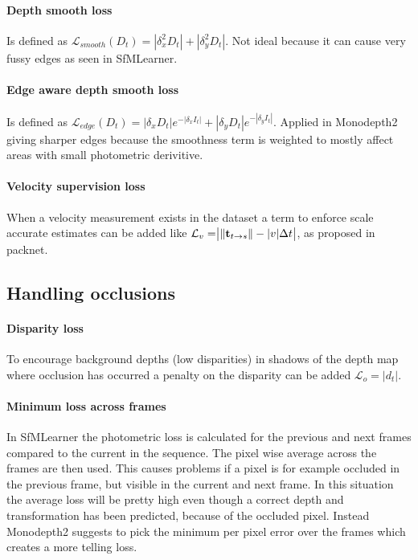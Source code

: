 \paragraph{Depth smooth loss} Is defined as $ \mathcal{L}_{smooth}(D_t)=|\delta_x^2 D_t|+|\delta_y^2 D_t| $. Not ideal because it can cause very fussy edges as seen in SfMLearner.

\paragraph{Edge aware depth smooth loss} Is defined as $ \mathcal{L}_{edge}(D_t)=|\delta_x D_t|e^{-|\delta_x I_t|} + |\delta_y D_t|e^{-|\delta_y I_t|} $. Applied in Monodepth2 giving sharper edges because the smoothness term is weighted to mostly affect areas with small photometric derivitive.

\paragraph{Velocity supervision loss} When a velocity measurement exists in the dataset a term to enforce scale accurate estimates can be added like $ \mathcal{L}_{v} = \bigr{|} \| \textbf{t}_{t \rightarrow s} \| - |v|\Delta t \bigr{|} $, as proposed in packnet\cite{packnet}.

\subsection{Handling occlusions}
\label{sec:occlusion}

\paragraph{Disparity loss} To encourage background depths (low disparities) in shadows of the depth map where occlusion has occurred a penalty on the disparity can be added $ \mathcal{L}_{o} =|d_t|. $

\paragraph{Minimum loss across frames} In SfMLearner the photometric loss is calculated for the previous and next frames compared to the current in the sequence. The pixel wise average across the frames are then used. This causes problems if a pixel is for example occluded in the previous frame, but visible in the current and next frame. In this situation the average loss will be pretty high even though a correct depth and transformation has been predicted, because of the occluded pixel. Instead Monodepth2 suggests to pick the minimum per pixel error over the frames which creates a more telling loss. 

